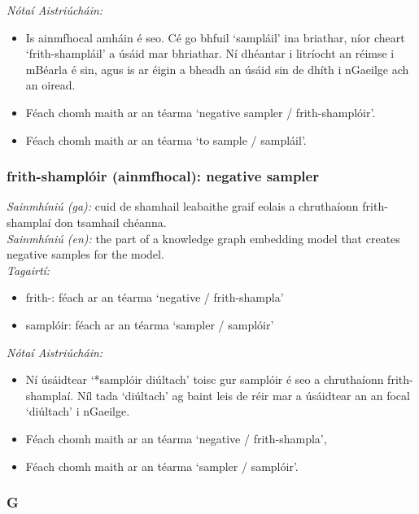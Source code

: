  \noindent \textit{Nótaí Aistriúcháin:}
\begin{itemize}
	\item Is ainmfhocal amháin é seo. Cé go bhfuil `sampláil' ina briathar, níor cheart `frith-shampláil' a úsáid mar bhriathar. Ní dhéantar i litríocht an réimse i mBéarla é sin, agus is ar éigin a bheadh an úsáid sin de dhíth i nGaeilge ach an oiread.
	\item Féach chomh maith ar an téarma `negative sampler / frith-shamplóir'.
	\item Féach chomh maith ar an téarma `to sample / sampláil'.
\end{itemize}


\subsubsection*{frith-shamplóir (ainmfhocal): negative sampler}
 \noindent \textit{Sainmhíniú (ga):} cuid de shamhail leabaithe graif eolais a chruthaíonn frith-shamplaí don tsamhail chéanna.
\\
 \noindent \textit{Sainmhíniú (en):} the part of a knowledge graph embedding model that creates negative samples for the model.
\\
 \noindent \textit{Tagairtí:}
\begin{itemize}
	\item frith-: féach ar an téarma `negative / frith-shampla'
	\item samplóir: féach ar an téarma `sampler / samplóir'
\end{itemize}

 \noindent \textit{Nótaí Aistriúcháin:}
\begin{itemize}
	\item Ní úsáidtear `*samplóir diúltach' toisc gur samplóir é seo a chruthaíonn frith-shamplaí. Níl tada `diúltach' ag baint leis de réir mar a úsáidtear an an focal `diúltach' i nGaeilge.
	\item Féach chomh maith ar an téarma `negative / frith-shampla',
	\item Féach chomh maith ar an téarma `sampler / samplóir'.
\end{itemize}


 \subsubsection*{G}

